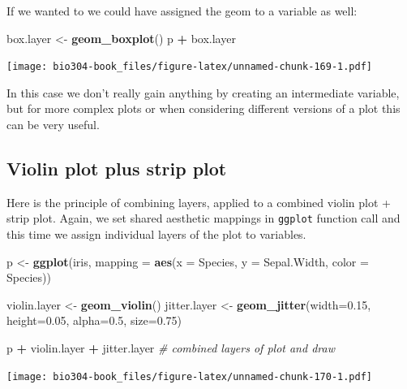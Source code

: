 \documentclass[]{book}
\newenvironment{Shaded}{\begin{snugshade}}{\end{snugshade}}
\newcommand{\CommentTok}[1]{\textcolor[rgb]{0.56,0.35,0.01}{\textit{#1}}}
\newcommand{\DataTypeTok}[1]{\textcolor[rgb]{0.13,0.29,0.53}{#1}}
\newcommand{\FloatTok}[1]{\textcolor[rgb]{0.00,0.00,0.81}{#1}}
\newcommand{\KeywordTok}[1]{\textcolor[rgb]{0.13,0.29,0.53}{\textbf{#1}}}
\newcommand{\NormalTok}[1]{#1}
\newcommand{\OperatorTok}[1]{\textcolor[rgb]{0.81,0.36,0.00}{\textbf{#1}}}
\newcommand{\StringTok}[1]{\textcolor[rgb]{0.31,0.60,0.02}{#1}}
\theoremstyle{definition}
\theoremstyle{definition}
\theoremstyle{definition}
\theoremstyle{remark}
\begin{document}
If we wanted to we could have assigned the geom to a variable as well:

\begin{Shaded}
\begin{Highlighting}[]
\NormalTok{box.layer <-}\StringTok{ }\KeywordTok{geom_boxplot}\NormalTok{()}
\NormalTok{p }\OperatorTok{+}\StringTok{ }\NormalTok{box.layer}
\end{Highlighting}
\end{Shaded}

\texttt{[image: bio304-book\_files/figure-latex/unnamed-chunk-169-1.pdf]}

In this case we don't really gain anything by creating an intermediate
variable, but for more complex plots or when considering different
versions of a plot this can be very useful.

\hypertarget{violin-plot-plus-strip-plot}{%
\subsection{Violin plot plus strip
plot}\label{violin-plot-plus-strip-plot}}

Here is the principle of combining layers, applied to a combined violin
plot + strip plot. Again, we set shared aesthetic mappings in
\texttt{ggplot} function call and this time we assign individual layers
of the plot to variables.

\begin{Shaded}
\begin{Highlighting}[]
\NormalTok{p <-}\StringTok{ }\KeywordTok{ggplot}\NormalTok{(iris, }\DataTypeTok{mapping =} \KeywordTok{aes}\NormalTok{(}\DataTypeTok{x =}\NormalTok{ Species, }\DataTypeTok{y =}\NormalTok{ Sepal.Width, }\DataTypeTok{color =}\NormalTok{ Species))}

\NormalTok{violin.layer <-}\StringTok{ }\KeywordTok{geom_violin}\NormalTok{()}
\NormalTok{jitter.layer <-}\StringTok{ }\KeywordTok{geom_jitter}\NormalTok{(}\DataTypeTok{width=}\FloatTok{0.15}\NormalTok{, }\DataTypeTok{height=}\FloatTok{0.05}\NormalTok{, }\DataTypeTok{alpha=}\FloatTok{0.5}\NormalTok{, }\DataTypeTok{size=}\FloatTok{0.75}\NormalTok{)}

\NormalTok{p }\OperatorTok{+}\StringTok{ }\NormalTok{violin.layer }\OperatorTok{+}\StringTok{ }\NormalTok{jitter.layer }\CommentTok{# combined layers of plot and draw}
\end{Highlighting}
\end{Shaded}

\texttt{[image: bio304-book\_files/figure-latex/unnamed-chunk-170-1.pdf]}
\end{document}
